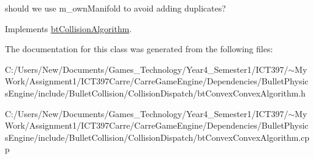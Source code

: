 should we use m\_\-ownManifold to avoid adding duplicates? 

Implements \hyperlink{classbt_collision_algorithm}{btCollisionAlgorithm}.

The documentation for this class was generated from the following files:\begin{CompactItemize}
\item 
C:/Users/New/Documents/Games\_\-Technology/Year4\_\-Semester1/ICT397/$\sim$My Work/Assignment1/ICT397Carre/CarreGameEngine/Dependencies/BulletPhysicsEngine/include/BulletCollision/CollisionDispatch/btConvexConvexAlgorithm.h\item 
C:/Users/New/Documents/Games\_\-Technology/Year4\_\-Semester1/ICT397/$\sim$My Work/Assignment1/ICT397Carre/CarreGameEngine/Dependencies/BulletPhysicsEngine/include/BulletCollision/CollisionDispatch/btConvexConvexAlgorithm.cpp\end{CompactItemize}
